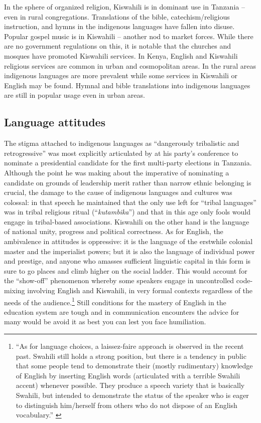 \documentclass[output=paper,colorlinks,citecolor=brown]{langscibook}
\begin{document}
In the sphere of organized religion, Kiswahili is in dominant use in Tanzania – even in rural congregations.  Translations of the bible, catechism/religious instruction, and hymns in the indigenous languages have fallen into disuse.  Popular gospel music is in Kiswahili – another nod to market forces. While there are no government regulations on this, it is notable that the churches and mosques have promoted Kiswahili services. In Kenya, English and Kiswahili religious services are common in urban and cosmopolitan areas. In the rural areas indigenous languages are more prevalent while some services in Kiswahili or English may be found. Hymnal and bible translations into indigenous languages are still in popular usage even in urban areas.

\subsection{Language attitudes} 
The stigma attached to indigenous languages as “dangerously tribalistic and retrogressive” was most explicitly articulated by \citet{Nyerere1995} at his party’s conference to nominate a presidential candidate for the first multi-party elections in Tanzania. Although the point he was making about the imperative of nominating a candidate on grounds of leadership merit rather than narrow ethnic belonging is crucial, the damage to the cause of indigenous languages and cultures was colossal: in that speech he maintained that the only use left for “tribal languages” was in tribal religious ritual (“\textit{kutambika}”) and that in this age only fools would engage in tribal-based associations. Kiswahili on the other hand is the language of national unity, progress and political correctness. As for English, the ambivalence in attitudes is oppressive: it is the language of the erstwhile colonial master and the imperialist powers; but it is also the language of individual power and prestige, and anyone who amasses sufficient linguistic capital in this form is sure to go places and climb higher on the social ladder. This would account for the “show-off” phenomenon whereby some speakers engage in uncontrolled code-mixing involving English and Kiswahili, in very formal contexts regardless of the needs of the audience.\footnote{“As for language choices, a {laissez-faire} approach is observed in the recent past. Swahili still holds a strong position, but there is a tendency in public that some people tend to demonstrate their (mostly rudimentary) knowledge of English by inserting English words (articulated with a terrible Swahili accent) whenever possible. They produce a speech variety that is basically Swahili, but intended to demonstrate the status of the speaker who is eager to distinguish him/herself from others who do not dispose of an English vocabulary.” \citep[54]{Legere2010}} Still conditions for the mastery of English in the education system are tough and in communication encounters the advice for many would be avoid it as best you can lest you face humiliation.
\end{document}
